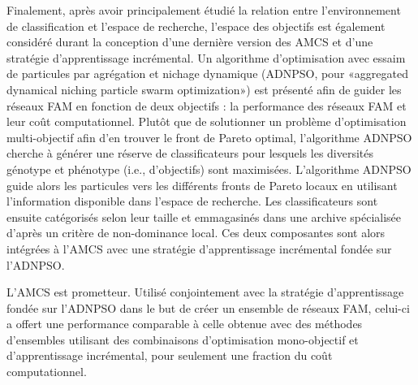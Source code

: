 Finalement, après avoir principalement étudié la relation entre l’environnement de classification et l’espace de recherche, l’espace des objectifs est également considéré durant la conception d’une dernière version des AMCS et d’une stratégie d’apprentissage incrémental. Un algorithme d’optimisation avec essaim de particules par agrégation et nichage dynamique (ADNPSO, pour «aggregated dynamical niching particle swarm optimization») est présenté afin de guider les réseaux FAM en fonction de deux objectifs : la performance des réseaux FAM et leur coût computationnel. Plutôt que de solutionner un problème d’optimisation multi-objectif afin d’en trouver le front de Pareto optimal, l’algorithme ADNPSO cherche à générer une réserve de classificateurs pour lesquels les diversités génotype et phénotype (i.e., d'objectifs) sont maximisées. L’algorithme ADNPSO guide alors les particules vers les différents fronts de Pareto locaux en utilisant l’information disponible dans l’espace de recherche. Les classificateurs sont ensuite catégorisés selon leur taille et emmagasinés dans une archive spécialisée d'après un critère de non-dominance local. Ces deux composantes sont alors intégrées à l'AMCS avec une stratégie d’apprentissage incrémental fondée sur l’ADNPSO.

L'AMCS est prometteur. Utilisé conjointement avec la stratégie d’apprentissage fondée sur l’ADNPSO dans le but de créer un ensemble de réseaux FAM, celui-ci a offert une performance comparable à celle obtenue avec des méthodes d’ensembles utilisant des combinaisons d’optimisation mono-objectif et d’apprentissage incrémental, pour seulement une fraction du coût computationnel.
